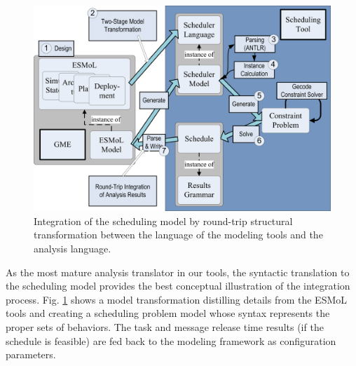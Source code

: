 \begin{figure}
\centering
\includegraphics[width=\columnwidth]{figures/sched_integration.png}
    \caption{Integration of the scheduling model by round-trip structural transformation between the language 
of the modeling tools and the analysis language.}
    \label{fig:sched_int}
\end{figure}

As the most mature analysis translator in our tools, the syntactic translation to the scheduling model 
provides the best conceptual illustration of the integration process.  Fig. \ref{fig:sched_int} shows a 
model transformation distilling details from the ESMoL tools and creating a scheduling problem model whose 
syntax represents the proper sets of behaviors.  The task and message release time results (if the schedule 
is feasible) are fed back to the modeling framework as configuration parameters.
